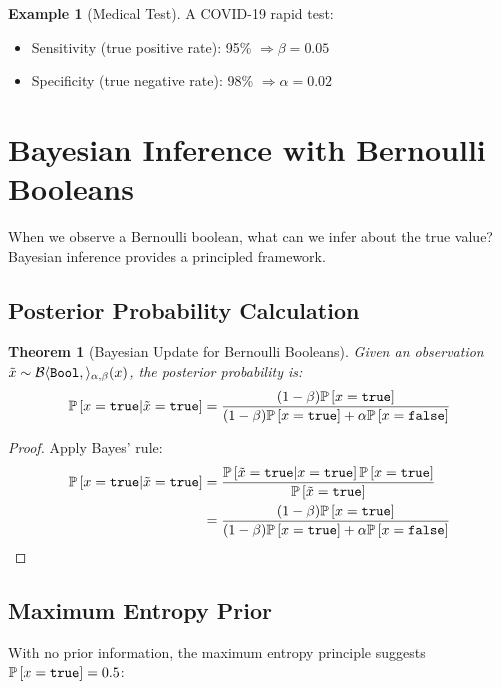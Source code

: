 \documentclass[11pt,twoside,openright]{book}
\theoremstyle{definition}
\newtheorem{example}[definition]{Example}
\theoremstyle{plain}
\newtheorem{theorem}[definition]{Theorem}
\theoremstyle{remark}
\begin{document}
\begin{example}[Medical Test]
A COVID-19 rapid test:
\begin{itemize}
    \item Sensitivity (true positive rate): 95\% $\Rightarrow \beta = 0.05$
    \item Specificity (true negative rate): 98\% $\Rightarrow \alpha = 0.02$
\end{itemize}
\end{example}

\section{Bayesian Inference with Bernoulli Booleans}

When we observe a Bernoulli boolean, what can we infer about the true value? Bayesian inference provides a principled framework.

\subsection{Posterior Probability Calculation}

\begin{theorem}[Bayesian Update for Bernoulli Booleans]
Given an observation $\tilde{x} \sim \mathcal{B}\langle \mathtt{Bool},  \rangle_{\alpha,\beta}(x)$, the posterior probability is:
\begin{equation}
\mathbb{P}\left[x = \mathtt{true} | \tilde{x} = \mathtt{true}\right] = \frac{(1-\beta) \mathbb{P}\left[x = \mathtt{true}\right]}{(1-\beta) \mathbb{P}\left[x = \mathtt{true}\right] + \alpha \mathbb{P}\left[x = \mathtt{false}\right]}
\end{equation}
\end{theorem}

\begin{proof}
Apply Bayes' rule:
\begin{align}
\mathbb{P}\left[x = \mathtt{true} | \tilde{x} = \mathtt{true}\right] &= \frac{\mathbb{P}\left[\tilde{x} = \mathtt{true} | x = \mathtt{true}\right] \mathbb{P}\left[x = \mathtt{true}\right]}{\mathbb{P}\left[\tilde{x} = \mathtt{true}\right]} \\
&= \frac{(1-\beta) \mathbb{P}\left[x = \mathtt{true}\right]}{(1-\beta) \mathbb{P}\left[x = \mathtt{true}\right] + \alpha \mathbb{P}\left[x = \mathtt{false}\right]}
\end{align}
\end{proof}

\subsection{Maximum Entropy Prior}

With no prior information, the maximum entropy principle suggests $\mathbb{P}\left[x = \mathtt{true}\right] = 0.5$:
\end{document}

